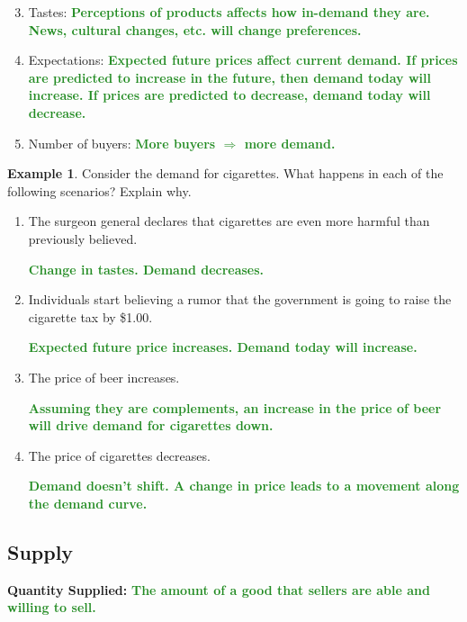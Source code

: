 \documentclass[11pt]{article}\usepackage[]{graphicx}\usepackage[]{color}
\theoremstyle{definition}
\newtheorem{exmp}{Example}[section]
\newcommand{\ddp}[1]{{\textbf{\textcolor{ForestGreen}{#1}}}}
\newcommand{\defn}[1]{\textbf{#1}}
\begin{document}
	\begin{enumerate}
		\setcounter{enumi}{2}
		\setlength{\itemsep}{15pt}
		\item Tastes: \ddp{Perceptions of products affects how in-demand they are. News, cultural changes, etc. will change preferences.}
		\item Expectations: \ddp{Expected future prices affect current demand. If prices are predicted to increase in the future, then demand today will increase. If prices are predicted to decrease, demand today will decrease.}
		\item Number of buyers: \ddp{More buyers $\Rightarrow$ more demand.}
	\end{enumerate}
	
	

	\begin{exmp}
	Consider the demand for cigarettes. What happens in each of the following scenarios? Explain why.
	\begin{enumerate}
	\setlength{\itemsep}{1em}		
	\item	The surgeon general declares that cigarettes are even more harmful than previously believed.
 
	\ddp{Change in tastes. Demand decreases.}
	
	
	\item	Individuals start believing a rumor that the government is going to raise the cigarette tax by \$1.00.
 
	\ddp{Expected future price increases. Demand today will increase.}
	
	
	\item 	The price of beer increases. 

	\ddp{Assuming they are complements, an increase in the price of beer will drive demand for cigarettes down.}

	
	\item 	The price of cigarettes decreases.  
	
	\ddp{Demand doesn't shift. A change in price leads to a movement along the demand curve.}
\end{enumerate}
	\end{exmp}

	\subsection{Supply}
	
	\defn{Quantity Supplied:} \ddp{The amount of a good that sellers are able and willing to sell.\\}
\end{document}
